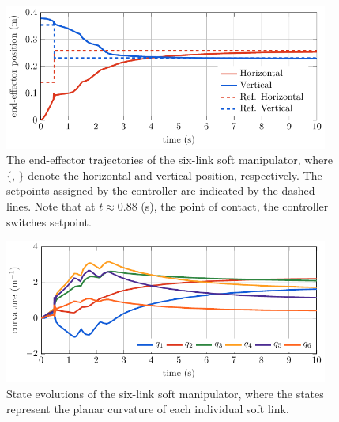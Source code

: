 \begin{figure}[!t]
    \centering
    \includegraphics*[width=0.95\textwidth]{./pdf/thesis-figure-6-30.pdf}
    \caption{The end-effector trajectories of the six-link soft manipulator, where $\{$, $\}$ denote the horizontal and vertical position, respectively. The setpoints assigned by the controller are indicated by the dashed lines. Note that at $t \approx 0.88$ (s), the point of contact, the controller switches setpoint. }
    \label{fig:C5:dellasantina_endeffector}
    \vspace{-3mm}
\end{figure}
%
\begin{figure}[!t]
    \centering
    \includegraphics*[width=0.95\textwidth]{./pdf/thesis-figure-6-31.pdf}
    \caption{State evolutions of the six-link soft manipulator, where the states represent the planar curvature of each individual soft link. }
    \label{fig:C5:dellasantina_states}
    \vspace{-3mm}
\end{figure}
%
